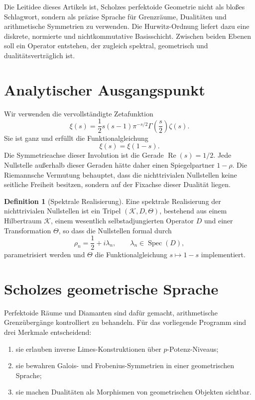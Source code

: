 \documentclass[11pt,a4paper,reqno]{amsart}
\theoremstyle{definition}
\newtheorem{definition}[theorem]{Definition}
\numberwithin{equation}{section}
\newcommand{\Reals}{\operatorname{Re}}
\begin{document}
Die Leitidee dieses Artikels ist, Scholzes perfektoide Geometrie nicht als bloßes Schlagwort, sondern als präzise Sprache für Grenzräume, Dualitäten und arithmetische Symmetrien zu verwenden. Die Hurwitz-Ordnung liefert dazu eine diskrete, normierte und nichtkommutative Basisschicht. Zwischen beiden Ebenen soll ein Operator entstehen, der zugleich spektral, geometrisch und dualitätsverträglich ist.

\section{Analytischer Ausgangspunkt}

Wir verwenden die vervollständigte Zetafunktion
\begin{equation}
  \xi(s)=\frac12 s(s-1)\pi^{-s/2}\Gamma\!\left(\frac{s}{2}\right)\zeta(s).
\end{equation}
Sie ist ganz und erfüllt die Funktionalgleichung
\begin{equation}
  \xi(s)=\xi(1-s).
\end{equation}
Die Symmetrieachse dieser Involution ist die Gerade \(\Reals(s)=1/2\). Jede Nullstelle außerhalb dieser Geraden hätte daher einen Spiegelpartner \(1-\rho\). Die Riemannsche Vermutung behauptet, dass die nichttrivialen Nullstellen keine seitliche Freiheit besitzen, sondern auf der Fixachse dieser Dualität liegen.

\begin{definition}[Spektrale Realisierung]
Eine spektrale Realisierung der nichttrivialen Nullstellen ist ein Tripel \((\mathcal{K},D,\Theta)\), bestehend aus einem Hilbertraum \(\mathcal{K}\), einem wesentlich selbstadjungierten Operator \(D\) und einer Transformation \(\Theta\), so dass die Nullstellen formal durch
\begin{equation}
  \rho_n=\frac12+i\lambda_n,\qquad \lambda_n\in\operatorname{Spec}(D),
\end{equation}
parametrisiert werden und \(\Theta\) die Funktionalgleichung \(s\mapsto 1-s\) implementiert.
\end{definition}

\section{Scholzes geometrische Sprache}

Perfektoide Räume und Diamanten sind dafür gemacht, arithmetische Grenzübergänge kontrolliert zu behandeln. Für das vorliegende Programm sind drei Merkmale entscheidend:
\begin{enumerate}
  \item sie erlauben inverse Limes-Konstruktionen über \(p\)-Potenz-Niveaus;
  \item sie bewahren Galois- und Frobenius-Symmetrien in einer geometrischen Sprache;
  \item sie machen Dualitäten als Morphismen von geometrischen Objekten sichtbar.
\end{enumerate}
\end{document}

